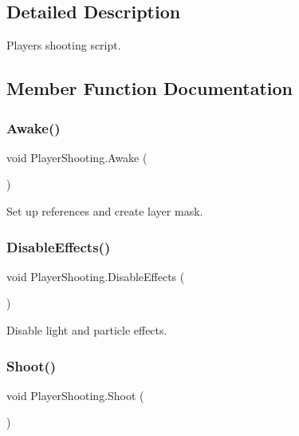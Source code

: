 \subsection{Detailed Description}
Players shooting script. 

\subsection{Member Function Documentation}
\mbox{\label{class_player_shooting_aea34d54bb699a98bfcc0d13aa2f2df0a}} 
\subsubsection{\texorpdfstring{Awake()}{Awake()}}
{\footnotesize\ttfamily void Player\+Shooting.\+Awake (\begin{DoxyParamCaption}{ }\end{DoxyParamCaption})\hspace{0.3cm}{\ttfamily [private]}}



Set up references and create layer mask. 

\mbox{\label{class_player_shooting_a8b6b1ad667dee36a8dc4bcc3ec8b6058}} 
\subsubsection{\texorpdfstring{DisableEffects()}{DisableEffects()}}
{\footnotesize\ttfamily void Player\+Shooting.\+Disable\+Effects (\begin{DoxyParamCaption}{ }\end{DoxyParamCaption})}



Disable light and particle effects. 

\mbox{\label{class_player_shooting_a2aec2512314c775757dcf9ad8c7782a4}} 
\subsubsection{\texorpdfstring{Shoot()}{Shoot()}}
{\footnotesize\ttfamily void Player\+Shooting.\+Shoot (\begin{DoxyParamCaption}{ }\end{DoxyParamCaption})}



